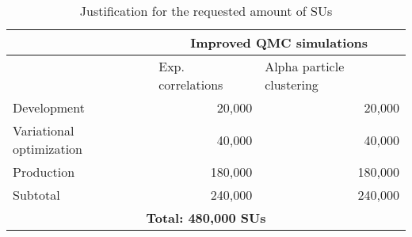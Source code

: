 \documentclass[12pt,letterpaper]{article}
\begin{document}
\begin{table}[htbp]
\centering
\caption{Justification for the requested amount of SUs}
\begin{tabular}{|l|r|r|}
\hline
 & \multicolumn{ 2}{c|}{\textbf{Improved QMC simulations}} \\ \hline
 & \multicolumn{1}{l|}{Exp. correlations} &
 \multicolumn{1}{l|}{Alpha particle clustering} \\ \hline
Development & 20,000 & 20,000 \\ \hline
Variational optimization & 40,000 & 40,000 \\ \hline
Production & 180,000 & 180,000 \\ \hline
Subtotal & 240,000 & 240,000 \\ \hline\hline
\multicolumn{ 3}{|c|}{\textbf{Total: 480,000 SUs}} \\ \hline
\end{tabular}
\label{tab:SUs}
\end{table}

{\color{red}{Lucas depending on how many SU's we want to apply for and how many you need we can adjust the above estimates.}}

\vspace{-0.5cm}


\end{document}
